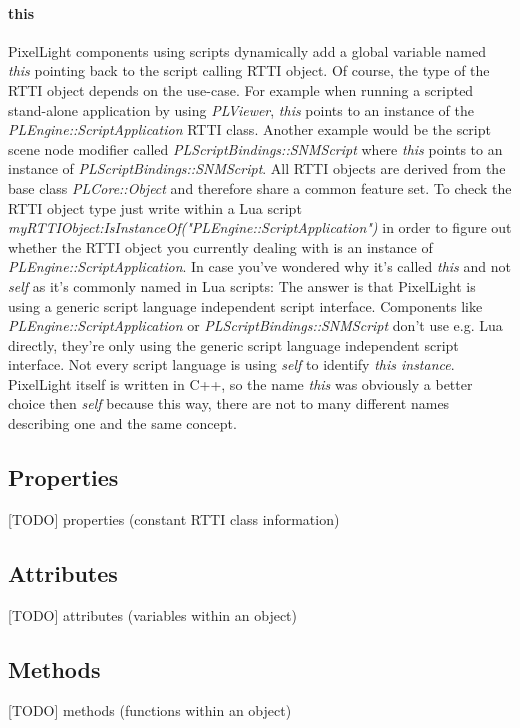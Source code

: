 \paragraph{this}
PixelLight components using scripts dynamically add a global variable named \emph{this} pointing back to the script calling RTTI object. Of course, the type of the RTTI object depends on the use-case. For example when running a scripted stand-alone application by using \emph{PLViewer}, \emph{this} points to an instance of the \emph{PLEngine::ScriptApplication} RTTI class. Another example would be the script scene node modifier called \emph{PLScriptBindings::SNMScript} where \emph{this} points to an instance of \emph{PLScriptBindings::SNMScript}. All RTTI objects are derived from the base class \emph{PLCore::Object} and therefore share a common feature set. To check the RTTI object type just write within a Lua script \emph{myRTTIObject:IsInstanceOf("PLEngine::ScriptApplication")} in order to figure out whether the RTTI object you currently dealing with is an instance of \emph{PLEngine::ScriptApplication}. In case you've wondered why it's called \emph{this} and not \emph{self} as it's commonly named in Lua scripts: The answer is that PixelLight is using a generic script language independent script interface. Components like \emph{PLEngine::ScriptApplication} or \emph{PLScriptBindings::SNMScript} don't use e.g. Lua directly, they're only using the generic script language independent script interface. Not every script language is using \emph{self} to identify \emph{this instance}. PixelLight itself is written in C++, so the name \emph{this} was obviously a better choice then \emph{self} because this way, there are not to many different names describing one and the same concept.


\subsection{Properties}
[TODO]
properties (constant RTTI class information)


\subsection{Attributes}
[TODO]
attributes (variables within an object)


\subsection{Methods}
[TODO]
methods (functions within an object)



